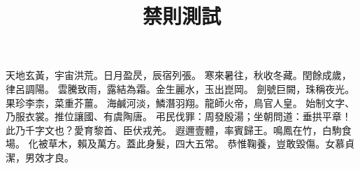\documentclass{ltc-cn-vbook}
\title{禁則測試}
\begin{document}
\begin{BodyText}
天地玄黃，宇宙洪荒。日月盈昃，辰宿列張。
寒來暑往，秋收冬藏。閏餘成歲，律呂調陽。
雲騰致雨，露結為霜。金生麗水，玉出崑岡。
劍號巨闕，珠稱夜光。果珍李柰，菜重芥薑。
海鹹河淡，鱗潛羽翔。龍師火帝，鳥官人皇。
始制文字、乃服衣裳。推位讓國、有虞陶唐。
弔民伐罪：周發殷湯；坐朝問道：垂拱平章！
此乃千字文也？愛育黎首、臣伏戎羌。
遐邇壹體，率賓歸王。鳴鳳在竹，白駒食場。
化被草木，賴及萬方。蓋此身髮，四大五常。
恭惟鞠養，豈敢毀傷。女慕貞潔，男效才良。
\end{BodyText}
\end{document}
